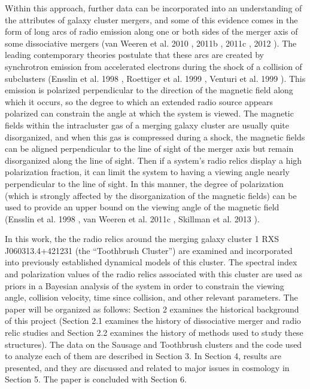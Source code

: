 \documentclass[12 pt]{article}
\begin{document}
Within this approach, further data can be incorporated into an understanding of the attributes of galaxy cluster mergers, and some of this evidence comes in the form of long arcs of radio emission along one or both sides of the merger axis of some dissociative mergers (van Weeren et al. 2010 \cite{reinout10}, 2011b \cite{reinout11b}, 2011c \cite{reinout11c}, 2012 \cite{reinout12}). The leading contemporary theories postulate that these arcs are created by synchrotron emission from accelerated electrons during the shock of a collision of subclusters (Ensslin et al. 1998 \cite{Ensslin98}, Roettiger et al. 1999 \cite{Roettiger99}, Venturi et al. 1999 \cite{Venturi99}). This emission is polarized perpendicular to the direction of the magnetic field along which it occurs, so the degree to which an extended radio source appears polarized can constrain the angle at which the system is viewed. The magnetic fields within the intracluster gas of a merging galaxy cluster are usually quite disorganized, and when this gas is compressed during a shock, the magnetic fields can be aligned perpendicular to the line of sight of the merger axis but remain disorganized along the line of sight. Then if a system's radio relics display a high polarization fraction, it can limit the system to having a viewing angle nearly perpendicular to the line of sight. In this manner, the degree of polarization (which is strongly affected by the disorganization of the magnetic fields) can be used to provide an upper bound on the viewing angle of the magnetic field (Ensslin et al. 1998 \cite{Ensslin98}, van Weeren et al. 2011c \cite{reinout11c}, Skillman et al. 2013 \cite{Skillman13}).

In this work, the the radio relics around the merging galaxy cluster 1 RXS J060313.4+421231 (the “Toothbrush Cluster”) are examined and incorporated into previously established dynamical models of this cluster. The spectral index and polarization values of the radio relics associated with this cluster are used as priors in a Bayesian analysis of the system in order to constrain the viewing angle, collision velocity, time since collision, and other relevant parameters. The paper will be organized as follows: Section 2 examines the historical background of this project (Section 2.1 examines the history of dissociative merger and radio relic studies and Section 2.2 examines the history of methods used to study these structures). The data on the Sausage and Toothbrush clusters and the code used to analyze each of them are described in Section 3. In Section 4, results are presented, and they are discussed and related to major issues in cosmology in Section 5. The paper is concluded with Section 6. 
\end{document}
